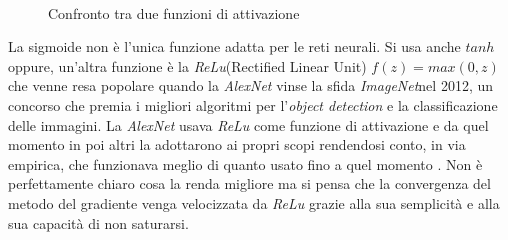
\begin{figure}[hbtb]
\centering
{} \qquad
{} \\
\caption{Confronto tra due funzioni di attivazione}
\label{sigmo}
\end{figure}
\vspace{0.8cm}

La sigmoide non è l'unica funzione adatta per le reti neurali. Si usa anche $tanh$ oppure, un'altra funzione è la \textit{ReLu}(Rectified Linear Unit)  $\displaystyle f(z)=max(0,z)$ che venne resa popolare quando la \textit{AlexNet} vinse la sfida \textit{ImageNet}nel 2012, un concorso che premia i migliori algoritmi per l'\textit{object detection} e la classificazione delle immagini. La \textit{AlexNet} usava \textit{ReLu} come funzione di attivazione e da quel momento in poi altri la adottarono ai propri scopi rendendosi conto, in via empirica, che funzionava meglio di quanto usato fino a quel momento \cite{krizhevsky2012imagenet}. Non è perfettamente chiaro cosa la renda migliore ma si pensa che la convergenza del metodo del gradiente venga velocizzata da \textit{ReLu} grazie alla sua semplicità e alla sua capacità di non saturarsi\cite{cs23}.

